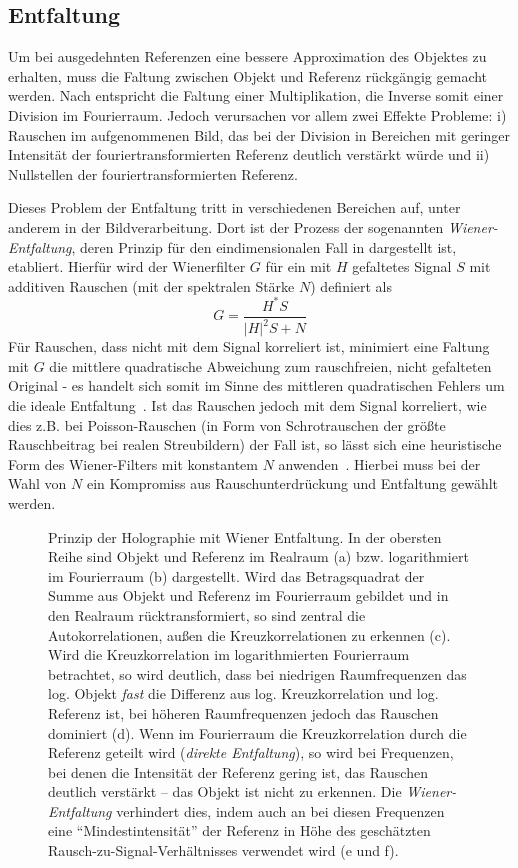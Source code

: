 \subsection{Entfaltung}
Um bei ausgedehnten Referenzen eine bessere Approximation des Objektes zu erhalten, muss die Faltung zwischen Objekt und Referenz rückgängig gemacht werden. Nach  entspricht die Faltung einer Multiplikation, die Inverse somit einer Division im Fourierraum. Jedoch verursachen vor allem zwei Effekte Probleme: i) Rauschen im aufgenommenen Bild, das bei der Division in Bereichen mit geringer Intensität der fouriertransformierten Referenz deutlich verstärkt würde und ii) Nullstellen der fouriertransformierten Referenz. 

Dieses Problem der Entfaltung tritt in verschiedenen Bereichen auf, unter anderem in der Bildverarbeitung.
Dort ist der Prozess der sogenannten \textit{Wiener-Entfaltung}, deren Prinzip für den eindimensionalen Fall in  dargestellt ist, etabliert. Hierfür wird der Wienerfilter $G$ für ein mit $H$ gefaltetes Signal $S$ mit additiven Rauschen (mit der spektralen Stärke $N$) definiert als
\begin{equation}
	G=\frac{H^* S}{\left|H\right|^2 S+N}
\end{equation}
Für Rauschen, dass nicht mit dem Signal korreliert ist, minimiert eine Faltung mit $G$ die mittlere quadratische Abweichung zum rauschfreien, nicht gefalteten Original - es handelt sich somit im Sinne des mittleren quadratischen Fehlers um die ideale Entfaltung~\cite{castleman1996}. Ist das Rauschen jedoch mit dem Signal korreliert, wie dies z.B. bei Poisson-Rauschen (in Form von Schrotrauschen der größte Rauschbeitrag bei realen Streubildern) der Fall ist, so lässt sich eine heuristische Form des Wiener-Filters mit konstantem $N$ anwenden~\cite{he2004}. Hierbei muss bei der Wahl von $N$ ein Kompromiss aus Rauschunterdrückung und Entfaltung gewählt werden.

\begin{figure}
	\centering
	\caption[Prinzip Enfaltung]{Prinzip der Holographie mit  Wiener Entfaltung. In der obersten Reihe sind Objekt und Referenz im Realraum (a) bzw. logarithmiert im Fourierraum (b) dargestellt. Wird das Betragsquadrat der Summe aus Objekt und Referenz im Fourierraum gebildet und in den Realraum rücktransformiert, so sind zentral die Autokorrelationen, außen die Kreuzkorrelationen zu erkennen (c). Wird die Kreuzkorrelation im logarithmierten Fourierraum betrachtet, so wird deutlich, dass bei niedrigen Raumfrequenzen das log. Objekt \textit{fast} die Differenz aus log. Kreuzkorrelation und log. Referenz ist, bei höheren Raumfrequenzen jedoch das Rauschen dominiert (d). Wenn im Fourierraum die Kreuzkorrelation durch die Referenz geteilt wird (\textit{direkte Entfaltung}), so wird bei Frequenzen, bei denen die Intensität der Referenz gering ist, das Rauschen deutlich verstärkt -- das Objekt ist nicht zu erkennen. Die \textit{Wiener-Entfaltung} verhindert dies, indem auch an bei diesen Frequenzen eine "`Mindestintensität"' der Referenz in Höhe des geschätzten Rausch-zu-Signal-Verhältnisses verwendet wird (e und f). }
	\label{fig:wiener}
\end{figure} 

